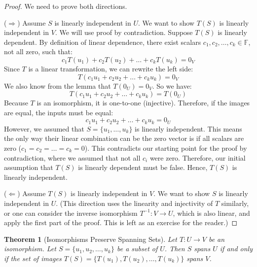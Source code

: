 \documentclass[11pt, letterpaper]{article}
\theoremstyle{mytheoremstyle}
\newtheorem{theorem}{Theorem}[section]
\theoremstyle{mydefinitionstyle}
\theoremstyle{myremarkstyle}
\newcommand{\F}{\mathbb{F}}
\begin{document}
\begin{proof} We need to prove both directions.

($\Rightarrow$) Assume $S$ is linearly independent in $U$. We want to show $T(S)$ is linearly independent in $V$. We will use proof by contradiction. Suppose $T(S)$ is linearly dependent. By definition of linear dependence, there exist scalars $c_1, c_2, \dots, c_k \in \F$, not all zero, such that:
\[ c_1 T(u_1) + c_2 T(u_2) + \dots + c_k T(u_k) = 0_V \]
Since $T$ is a linear transformation, we can rewrite the left side:
\[ T(c_1 u_1 + c_2 u_2 + \dots + c_k u_k) = 0_V \]
We also know from the lemma that $T(0_U) = 0_V$. So we have:
\[ T(c_1 u_1 + c_2 u_2 + \dots + c_k u_k) = T(0_U) \]
Because $T$ is an isomorphism, it is one-to-one (injective). Therefore, if the images are equal, the inputs must be equal:
\[ c_1 u_1 + c_2 u_2 + \dots + c_k u_k = 0_U \]
However, we assumed that $S = \{u_1, \dots, u_k\}$ is linearly independent. This means the only way their linear combination can be the zero vector is if all scalars are zero ($c_1 = c_2 = \dots = c_k = 0$). This contradicts our starting point for the proof by contradiction, where we assumed that not all $c_i$ were zero.
Therefore, our initial assumption that $T(S)$ is linearly dependent must be false. Hence, $T(S)$ is linearly independent.

($\Leftarrow$) Assume $T(S)$ is linearly independent in $V$. We want to show $S$ is linearly independent in $U$. (This direction uses the linearity and injectivity of $T$ similarly, or one can consider the inverse isomorphism $T^{-1}: V \to U$, which is also linear, and apply the first part of the proof. This is left as an exercise for the reader.)
\end{proof}

\begin{theorem}[Isomorphisms Preserve Spanning Sets]
Let $T: U \to V$ be an isomorphism. Let $S = \{u_1, u_2, \dots, u_k\}$ be a subset of $U$. Then $S$ spans $U$ if and only if the set of images $T(S) = \{T(u_1), T(u_2), \dots, T(u_k)\}$ spans $V$.
\end{theorem}
\end{document}
